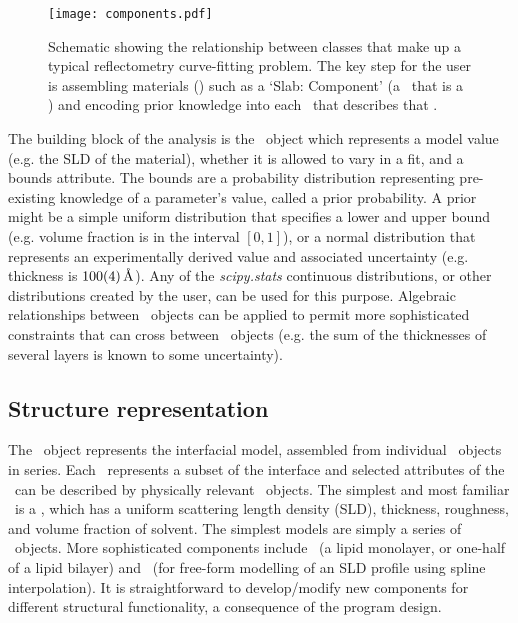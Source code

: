\documentclass[pdf,preprint]{article}
\begin{document}
\begin{figure}
  \texttt{[image: components.pdf]}
  \caption{Schematic showing the relationship between classes that make up a typical reflectometry curve-fitting problem. The key step for the user is assembling materials (\Component) such as a `Slab: Component' (a \Component\ that is a \Slab) and encoding prior knowledge into each \Parameter\ that describes that \Component.}
  \label{fig:components}
\end{figure}

The building block of the analysis is the \Parameter\ object which represents a model value (e.g. the SLD of the material), whether it is allowed to vary in a fit, and a bounds attribute. The bounds are a probability distribution representing pre-existing knowledge of a parameter's value, called a prior probability.
A prior might be a simple uniform distribution that specifies a lower and upper bound (e.g. volume fraction is in the interval $[0, 1]$), or a normal distribution that represents an experimentally derived value and associated uncertainty (e.g. thickness is $\SI{100+-4}{\angstrom}$).
Any of the \emph{scipy.stats} \cite{Jones2001-2017} continuous distributions, or other distributions created by the user, can be used for this purpose. Algebraic relationships between \Parameter\ objects can be applied to permit more sophisticated constraints that can cross between \Component\ objects (e.g. the sum of the thicknesses of several layers is known to some uncertainty).

\subsection{Structure representation}

The \Structure\ object represents the interfacial model, assembled from individual \Component\ objects in series. Each \Component\ represents a subset of the interface and selected attributes of the \Component\ can be described by physically relevant \Parameter\ objects. The simplest and most familiar \Component\ is a \Slab, which has a uniform scattering length density (SLD), thickness, roughness, and volume fraction of solvent. The simplest models are simply a series of \Slab\ objects.
More sophisticated components include \LipidLeaflet\ (a lipid monolayer, or one-half of a lipid bilayer) and \Spline\ (for free-form modelling of an SLD profile using spline interpolation).
It is straightforward to develop/modify new components for different structural functionality, a consequence of the program design.
\end{document}
